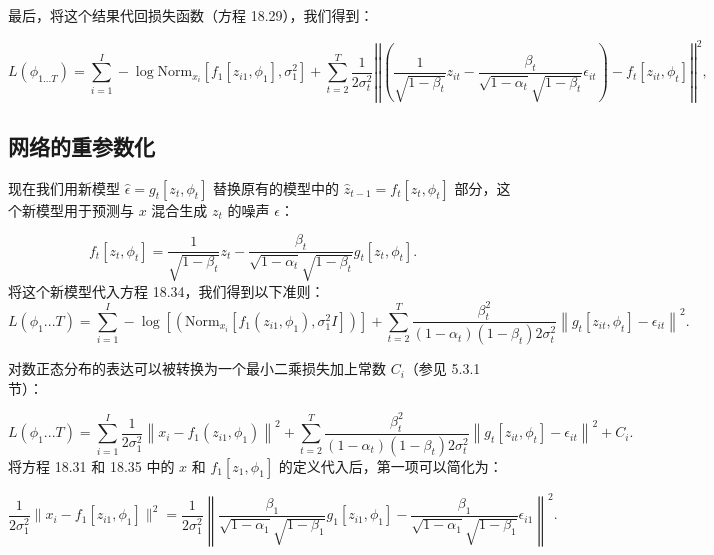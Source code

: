 最后，将这个结果代回损失函数（方程 18.29），我们得到：

\begin{equation}
L(\phi_{1...T}) = \sum_{i=1}^I -\log \text{Norm}_{x_i} [f_1[z_{i1}, \phi_1], \sigma^2_{1}] + \sum_{t=2}^T \frac{1}{2\sigma^2_t} \left| \left| \left( \frac{1}{\sqrt{1 - \beta_t}}z_{it} - \frac{\beta_t}{\sqrt{1 - \alpha_t}\sqrt{1 - \beta_t}}\epsilon_{it} \right) - f_t[z_{it}, \phi_t] \right| \right|^2, 
\end{equation}

\subsection{网络的重参数化}
现在我们用新模型 \(\hat{\epsilon} = g_t[z_t, \phi_t]\) 替换原有的模型中的 \(\hat{z}_{t-1} = f_t[z_t, \phi_t]\) 部分，这个新模型用于预测与 \(x\) 混合生成 \(z_t\) 的噪声 \(\epsilon\)：

\begin{equation}
f_t[z_t, \phi_t] = \frac{1}{\sqrt{1 - \beta_t}}z_t - \frac{\beta_t}{\sqrt{1 - \alpha_t}\sqrt{1 - \beta_t}}g_t[z_t, \phi_t].
\quad 
\end{equation}
将这个新模型代入方程 18.34，我们得到以下准则：
\begin{equation}
L(\phi_1...T) = \sum_{i=1}^{I} -\log \left[  \left( \text{Norm}_{x_i} [f_1(z_{i1}, \phi_1), \sigma_1^2 I] \right) \right] + \sum_{t=2}^{T} \frac{\beta_t^2}{(1 - \alpha_t)(1 - \beta_t)2\sigma_t^2} \left\| g_t[z_{it}, \phi_t] - \epsilon_{it} \right\|^2 . 
\end{equation}

对数正态分布的表达可以被转换为一个最小二乘损失加上常数 \(C_i\)（参见 5.3.1 节）：

\begin{equation}
L(\phi_1...T) = \sum_{i=1}^{I} \frac{1}{2\sigma_1^2} \left\| x_i - f_1(z_{i1}, \phi_1) \right\|^2 + \sum_{t=2}^{T} \frac{\beta_t^2}{(1 - \alpha_t)(1 - \beta_t)2\sigma_t^2} \left\| g_t[z_{it}, \phi_t] - \epsilon_{it} \right\|^2 + C_i.
\end{equation}
将方程 18.31 和 18.35 中的 \(x\) 和 \(f_1[z_1, \phi_1]\) 的定义代入后，第一项可以简化为：

\begin{equation}
\frac{1}{2\sigma_1^2} \|x_i - f_1[z_{i1}, \phi_1]\|^2 = \frac{1}{2\sigma_1^2} \left\| \frac{\beta_1}{\sqrt{1 - \alpha_1}\sqrt{1 - \beta_1}} g_1[z_{i1}, \phi_1] - \frac{\beta_1}{\sqrt{1 - \alpha_1}\sqrt{1 - \beta_1}} \epsilon_{i1} \right\|^2. 
\end{equation}

